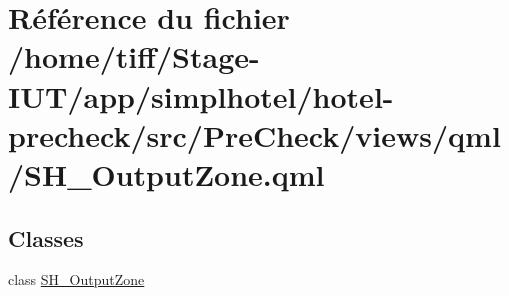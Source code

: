 \hypertarget{SH__OutputZone_8qml}{\section{Référence du fichier /home/tiff/\-Stage-\/\-I\-U\-T/app/simplhotel/hotel-\/precheck/src/\-Pre\-Check/views/qml/\-S\-H\-\_\-\-Output\-Zone.qml}
\label{SH__OutputZone_8qml}
}
\subsection*{Classes}
\begin{DoxyCompactItemize}
\item 
class \hyperlink{classSH__OutputZone}{S\-H\-\_\-\-Output\-Zone}
\end{DoxyCompactItemize}
